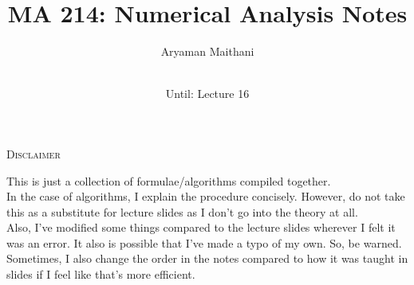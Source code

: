 \documentclass[12pt]{article}
\title{MA 214: Numerical Analysis Notes}
\author{Aryaman Maithani}
\date{\DTMnow\\
Until: Lecture 16}
\theoremstyle{definition}
\begin{document}
\maketitle
\begin{center}
	\textsc{Disclaimer}
\end{center}
This is just a collection of formulae/algorithms compiled together.\\
In the case of algorithms, I explain the procedure concisely. However, do not take this as a substitute for lecture slides as I don't go into the theory at all.\\
Also, I've modified some things compared to the lecture slides wherever I felt it was an error. It also is possible that I've made a typo of my own. So, be warned.\\
Sometimes, I also change the order in the notes compared to how it was taught in slides if I feel like that's more efficient.

\tableofcontents
\end{document}
